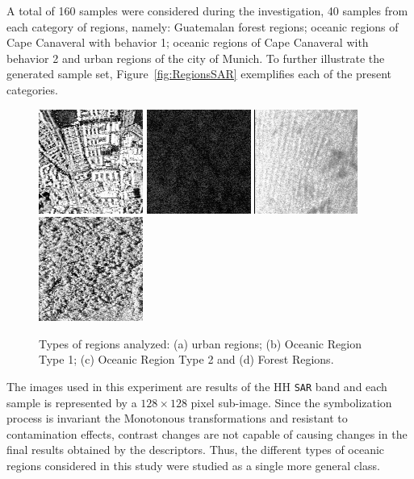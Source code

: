 \documentclass{isprs}
\begin{document}
	A total of 160 samples were considered during the investigation, 40 samples from each category of regions, namely: Guatemalan forest regions; oceanic regions of Cape Canaveral with behavior 1; oceanic regions of Cape Canaveral with behavior 2 and urban regions of the city of Munich. To further illustrate the generated sample set, Figure~\ref{fig:RegionsSAR} exemplifies each of the present categories.
	
	\begin{figure}[!h]
		\centering
		\includegraphics[width=.23\linewidth]{Figures/munichUrban.png}
		\includegraphics[width=.23\linewidth]{Figures/Cape1.png}
		\includegraphics[width=.23\linewidth]{Figures/Cape2.png}
		\includegraphics[width=.23\linewidth]{Figures/guatemalaflorest.png}
		\caption{Types of regions analyzed: (a) urban regions; (b) Oceanic Region Type 1; (c) Oceanic Region Type 2 and (d) Forest Regions.}\label{fig:RegioesSAR}
	\end{figure} 
	
	The images used in this experiment are results of the HH \texttt{SAR} band and each sample is represented by a $128 \times 128$ pixel sub-image.
	Since the symbolization process is invariant the Monotonous transformations and resistant to contamination effects, contrast changes are not capable of causing changes in the final results obtained by the descriptors.
	Thus, the different types of oceanic regions considered in this study were studied as a single more general class.
	
\end{document}
